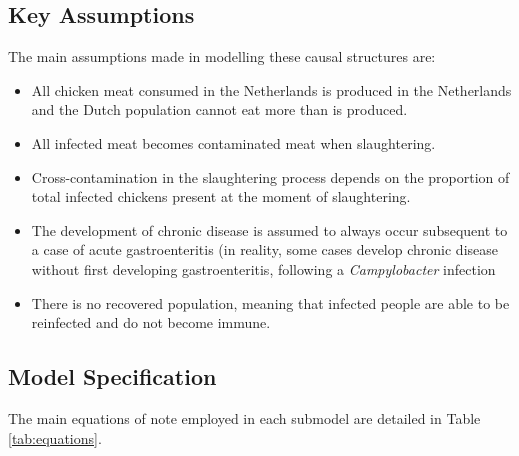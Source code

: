 \subsection{Key Assumptions}
\label{s:assumptions}
The main assumptions made in modelling these causal structures are:
\begin{itemize}
    \item All chicken meat consumed in the Netherlands is produced in the Netherlands and the Dutch population cannot eat more than is produced.
    \item All infected meat becomes contaminated meat when slaughtering.
    \item Cross-contamination in the slaughtering process depends on the proportion of total infected chickens present at the moment of slaughtering. %
    \item The development of chronic disease is assumed to always occur subsequent to a case of acute gastroenteritis (in reality, some cases develop chronic disease without first developing gastroenteritis, following a \textit{Campylobacter} infection
    \item There is no recovered population, meaning that infected people are able to be reinfected and do not become immune.
\end{itemize}


\subsection{Model Specification}
The main equations of note employed in each submodel are detailed in Table \ref{tab:equations}.

